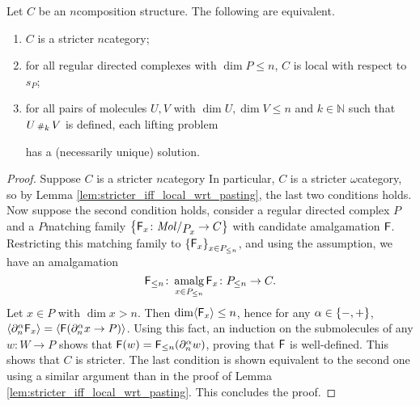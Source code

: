 \begin{lem} \label{lem:stricter_n_iff_local_with_dim_le_n}
    Let \( C \) be an \( n \)\nbd composition structure.
    The following are equivalent.
    \begin{enumerate}
        \item \( C \) is a stricter \( n \)\nbd category;
        \item for all regular directed complexes with \( \dim P \le n \), \( C \) is local with respect to \( s_P \);
        \item for all pairs of molecules \( U, V \) with \( \dim U, \dim V \le n \) and \( k \in \mathbb{N} \) such that \( U \cp{k} V \) is defined, each lifting problem
            \begin{center}
            \end{center}
            has a (necessarily unique) solution.
    \end{enumerate}
\end{lem}
\begin{proof}
    Suppose \( C \) is a stricter \( n \)\nbd category 
    In particular, \( C \) is a stricter \( \omega \)\nbd category, so by Lemma \ref{lem:stricter_iff_local_wrt_pasting}, the last two conditions holds.
    Now suppose the second condition holds, consider a regular directed complex \( P \) and a \( P \)\nbd matching family \( \set{\F_x \colon \molecin{\imel{P}{x}} \to C} \) with candidate amalgamation \( \F \).
    Restricting this matching family to \( \set{\F_x}_{x \in \gr{\le n}{P}} \), and using the assumption, we have an amalgamation 
    \begin{equation*}
        \gr{\le n}{\F} \colon \amalg_{x \in \gr{\le n}{P}} \F_x \colon \gr{\le n}{P} \to C.
    \end{equation*}
    Let \( x \in P \) with \( \dim x > n \).
    Then \( \dim \pcell{\F_x} \le n \), hence for any \( \a \in \set{-, +} \), \( \pcell{\bd{n}{\a} \F_x} = \pcell{\F(\bd{n}{\a} x \to P)} \).
    Using this fact, an induction on the submolecules of any \( w \colon W \to P \) shows that \( \F(w) = \gr{\le n}{\F}(\bd{n}{\a} w) \), proving that \( \F \) is well-defined.
    This shows that \( C \) is stricter.
    The last condition is shown equivalent to the second one using a similar argument than in the proof of Lemma \ref{lem:stricter_iff_local_wrt_pasting}.
    This concludes the proof.
\end{proof}

